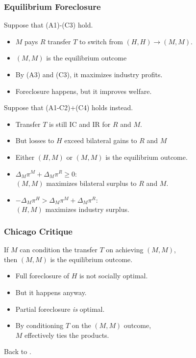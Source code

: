 \documentclass[aspectratio=169]{beamer}
\begin{document}
\begin{frame}
\frametitle{Equilibrium Foreclosure}
Suppose that (A1)-(C3) hold. 
\begin{itemize}
\item $M$ pays $R$ transfer $T$ to switch from $(H,H) \rightarrow (M,M)$.
\item $(M,M)$ is the equilibrium outcome 
\item By (A3) and (C3), it maximizes industry profits.
\item Foreclosure happens, but it improves welfare. %
\end{itemize}
\pause
Suppose that (A1-C2)$+$(C4) holds instead.
\begin{itemize}
\item Transfer $T$ is still IC and IR for $R$ and $M$.
\item But losses to $H$ exceed bilateral gains to $R$ and $M$
\item Either $(H,M)$ or $(M,M)$ is the equilibrium outcome.
\item $\Delta_M \pi^M + \Delta_M \pi^R \geq 0$:\\ 
$(M,M)$ maximizes \alert{bilateral surplus} to $R$ and $M$.
\item $-\Delta_M \pi^H  > \Delta_M \pi^M + \Delta_M \pi^R$: \\
$(H,M)$ maximizes \alert{industry surplus}.
\end{itemize}
\end{frame}

\begin{frame}
\frametitle{Chicago Critique}

If $M$ can condition the transfer $T$ on achieving $(M,M)$, \\
then $(M,M)$ is the equilibrium outcome.
\begin{itemize}
\item Full foreclosure of $H$ is \alert{not socially optimal}.
\item But it happens anyway.  
\item Partial foreclosure {\it is} optimal.
\item By conditioning $T$ on the $(M,M)$ outcome, \\ $M$ effectively ties the products.
\end{itemize}
Back to \hyperlink{intuition}{}.
\end{frame}
\end{document}
